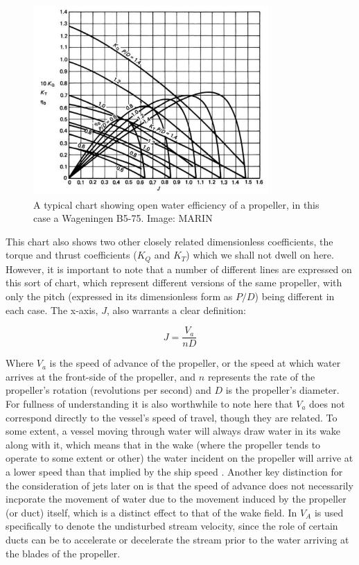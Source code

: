 \documentclass{article}\usepackage[]{graphicx}\usepackage[]{color}
\begin{document}
\begin{figure}[h]
\captionsetup{width=0.8\textwidth}
\includegraphics[width=0.8\textwidth]{OpenWater.png}
\caption{A typical chart showing open water efficiency of a propeller, in this case a Wageningen B5-75. Image: MARIN}
\label{fig:OpenWater.png}
\end{figure}

This chart also shows two other closely related dimensionless coefficients, the torque and thrust coefficients ($K_Q$ and $K_T$) which we shall not dwell on here.  However, it is important to note that a number of different lines are expressed on this sort of chart, which represent different versions of the same propeller, with only the pitch (expressed in its dimensionless form as $P/D$) being different in each case. The x-axis, $J$, also warrants a clear definition:

\begin{equation}
\label{eq:2}
J = \frac{V_a}{nD}
\end{equation}

Where $V_a$ is the speed of advance of the propeller, or the speed at which water arrives at the front-side of the propeller, and $n$ represents the rate of the propeller's rotation (revolutions per second) and $D$ is the propeller's diameter.  For fullness of understanding it is also worthwhile to note here that $V_a$ does not correspond directly to the vessel's speed of travel, though they are related. To some extent, a vessel moving through water will always draw water in its wake along with it, which means that in the wake (where the propeller tends to operate to some extent or other) the water incident on the propeller will arrive at a lower speed than that implied by the ship speed \parencite[15]{MAN2017}.  Another key distinction for the consideration of jets later on is that the speed of advance does not necessarily incporate the movement of water due to the movement induced by the propeller (or duct) itself, which is a distinct effect to that of the wake field. In \cite[213]{lewis1988} $V_A$ is used specifically to denote the undisturbed stream velocity, since the role of certain ducts can be to accelerate or decelerate the stream prior to the water arriving at the blades of the propeller.
\end{document}
